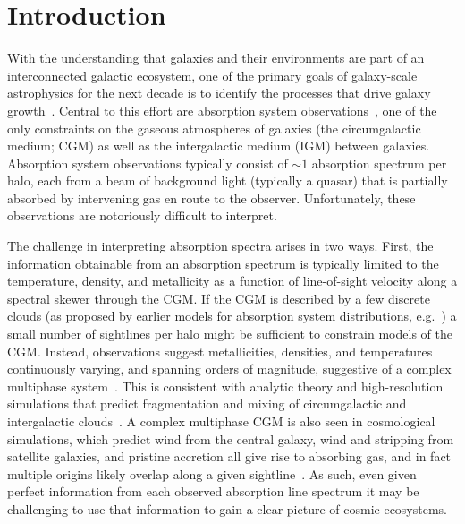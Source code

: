 \documentclass[fleqn,usenatbib]{mnras}
\begin{document}
\section{Introduction}

With the understanding that galaxies and their environments are part of an interconnected galactic ecosystem, one of the primary goals of galaxy-scale astrophysics for the next decade is to identify the processes that drive galaxy growth~\citep{Decadal2020}.
Central to this effort are absorption system observations~\citep[e.g.][]{bahcall1993Hubble, lanzetta1995Gaseous, lauroesch1996QSO, Charlton1996,churchill1996Spatial,Prochaska1997,Rauch1997,Tumlinson2013,Werk2014,Prochaska2017,Kacprzak2019,Lehner2020}, one of the only constraints on the gaseous atmospheres of galaxies (the circumgalactic medium; CGM) as well as the intergalactic medium (IGM) between galaxies.
Absorption system observations typically consist of $\sim 1$ absorption spectrum per halo, each from a beam of background light (typically a quasar) that is partially absorbed by intervening gas en route to the observer.
Unfortunately, these observations are notoriously difficult to interpret.

The challenge in interpreting absorption spectra arises in two ways.
First, the information obtainable from an absorption spectrum is typically limited to the temperature, density, and metallicity as a function of line-of-sight velocity along a spectral skewer through the CGM.
If the CGM is described by a few discrete clouds (as proposed by earlier models for absorption system distributions, e.g.~\citealt{srianand1994Halo, das2001Unified, maller2003Damped}) a small number of sightlines per halo might be sufficient to constrain models of the CGM.
Instead, observations suggest metallicities, densities, and temperatures continuously varying, and spanning orders of magnitude, suggestive of a complex multiphase system~\citep{Lehner2019, Lehner2022}.
This is consistent with analytic theory and high-resolution simulations that predict fragmentation and mixing of circumgalactic and intergalactic clouds~\citep[e.g.][]{maller2004Multiphase, mccourt2018Characteristic, hummels2019Impact, vandevoort2019Cosmological, peeples2019Figuring, mandelker2019Shattering, mandelker2021Thermal}.
A complex multiphase CGM is also seen in cosmological simulations, which predict wind from the central galaxy, wind and stripping from satellite galaxies, and pristine accretion all give rise to absorbing gas, and in fact multiple origins likely overlap along a given sightline~\citep[e.g.][]{hafen2019Origins, hafen2020Fates}.
As such, even given perfect information from each observed absorption line spectrum it may be challenging to use that information to gain a clear picture of cosmic ecosystems.
\end{document}

